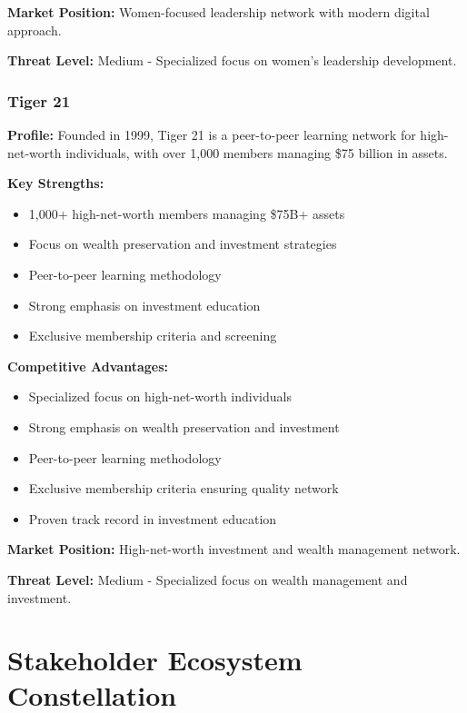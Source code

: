 \textbf{Market Position:} Women-focused leadership network with modern digital approach.

\textbf{Threat Level:} Medium - Specialized focus on women's leadership development.

\subsubsection{Tiger 21}
\textbf{Profile:} Founded in 1999, Tiger 21 is a peer-to-peer learning network for high-net-worth individuals, with over 1,000 members managing \$75 billion in assets.

\textbf{Key Strengths:}
\begin{itemize}
    \item 1,000+ high-net-worth members managing \$75B+ assets
    \item Focus on wealth preservation and investment strategies
    \item Peer-to-peer learning methodology
    \item Strong emphasis on investment education
    \item Exclusive membership criteria and screening
\end{itemize}

\textbf{Competitive Advantages:}
\begin{itemize}
    \item Specialized focus on high-net-worth individuals
    \item Strong emphasis on wealth preservation and investment
    \item Peer-to-peer learning methodology
    \item Exclusive membership criteria ensuring quality network
    \item Proven track record in investment education
\end{itemize}

\textbf{Market Position:} High-net-worth investment and wealth management network.

\textbf{Threat Level:} Medium - Specialized focus on wealth management and investment.

\section{Stakeholder Ecosystem Constellation}

